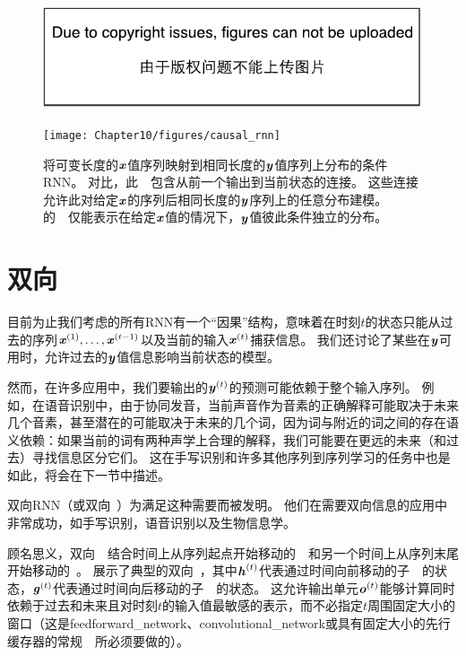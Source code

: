 \begin{figure}[!htb]
\ifOpenSource
\centerline{\includegraphics{figure.pdf}}
\else
\centerline{\texttt{[image: Chapter10/figures/causal\_rnn]}}
\fi
\caption{将可变长度的$\boldsymbol{\mathit{x}}$值序列映射到相同长度的$\boldsymbol{\mathit{y}}$值序列上分布的条件\gls{RNN}。
对比，此~~包含从前一个输出到当前状态的连接。
这些连接允许此对给定$\boldsymbol{\mathit{x}}$的序列后相同长度的$\boldsymbol{\mathit{y}}$序列上的任意分布建模。
的~~仅能表示在给定$\boldsymbol{\mathit{x}}$值的情况下，$\boldsymbol{\mathit{y}}$值彼此条件独立的分布。
}
\label{fig:chap10_causal_rnn}
\end{figure}



\section{双向~}
\label{sec:bidirectional_rnns}
目前为止我们考虑的所有\gls{RNN}有一个``因果''结构，意味着在时刻$t$的状态只能从过去的序列$\boldsymbol{\mathit{x}}^{(1)},\dots,\boldsymbol{\mathit{x}}^{(t-1)}$以及当前的输入$\boldsymbol{\mathit{x}}^{(t)}$捕获信息。
我们还讨论了某些在$\boldsymbol{\mathit{y}}$可用时，允许过去的$\boldsymbol{\mathit{y}}$值信息影响当前状态的模型。

然而，在许多应用中，我们要输出的$\boldsymbol{\mathit{y}}^{(t)}$的预测可能依赖于整个输入序列。
例如，在语音识别中，由于协同发音，当前声音作为音素的正确解释可能取决于未来几个音素，甚至潜在的可能取决于未来的几个词，因为词与附近的词之间的存在语义依赖：如果当前的词有两种声学上合理的解释，我们可能要在更远的未来（和过去）寻找信息区分它们。
这在手写识别和许多其他序列到序列学习的任务中也是如此，将会在下一节中描述。

双向\gls{RNN}（或双向~）为满足这种需要而被发明\citep{Schuster+Paliwal-1997}。
他们在需要双向信息的应用中非常成功\citep{Graves-book2012}，如手写识别\citep{Graves-et-al-NIPS2007,Graves+Schmidhuber-2009}，语音识别\citep{Graves+Schmidhuber-2005,Graves-et-al-ICASSP2013}以及生物信息学\citep{Baldi-et-al-1999}。

顾名思义，双向~~结合时间上从序列起点开始移动的~~和另一个时间上从序列末尾开始移动的~。
展示了典型的双向~，其中$\boldsymbol{\mathit{h}}^{(t)}$代表通过时间向前移动的子~~的状态，$\boldsymbol{\mathit{g}}^{(t)}$代表通过时间向后移动的子~~的状态。
这允许输出单元$\boldsymbol{\mathit{o}}^{(t)}$能够计算同时依赖于过去和未来且对时刻$t$的输入值最敏感的表示，而不必指定$t$周围固定大小的窗口（这是\gls{feedforward_network}、\gls{convolutional_network}或具有固定大小的先行缓存器的常规~~所必须要做的）。

